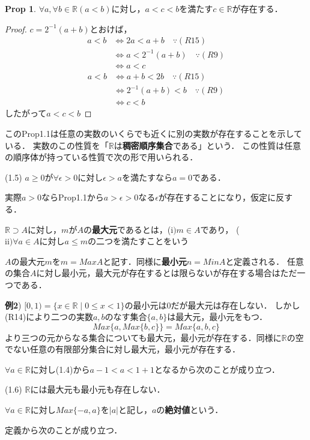 \documentclass{ltjsarticle}
\theoremstyle{definition}
\newtheorem{prop}[thm]{Prop}
\theoremstyle{propcorollarystyle}
\theoremstyle{thmcorollarystyle}
\begin{document}
\begin{prop}
 $\forall a,\forall b \in \mathbb{R}(a<b)$に対し，$a<c<bを満たすc \in \mathbb{R}$が存在する．
\end{prop} 
\begin{proof}
  $c=2^{-1}(a+b)$とおけば，
  \begin{align*}
    a <b 
    &\iff 2a < a+b \quad \because (R15) \\
    &\iff a < 2^{-1}(a+b) \quad \because (R9) \\
    &\iff a < c
  \end{align*}
  \begin{align*}
    a < b 
    &\iff a+b < 2b \quad \because (R15) \\
    &\iff 2^{-1}(a+b) < b \quad \because (R9) \\
    &\iff c < b
  \end{align*}
  したがって$a < c < b$
\end{proof}

このProp1.1は任意の実数のいくらでも近くに別の実数が存在することを示している．
実数のこの性質を「$\mathbb{R}$は\textbf{稠密順序集合}である」という．
この性質は任意の順序体が持っている性質で次の形で用いられる．\par
(1.5) $a \ge 0$が$\forall \epsilon >0$に対し$\epsilon > a$を満たすなら$a = 0$である．\par
実際$a > 0$ならProp1.1から$a>\epsilon >0なる\epsilon$が存在することになり，仮定に反する．

$\mathbb{R} \supset A$に対し，$mがA$の\textbf{最大元}であるとは，($\mathrm{i})m \in A$であり，
($\mathrm{ii})\forall a \in A に対しa \le m$の二つを満たすことをいう\par
$Aの最大元mをm=MaxA$と記す．同様に\textbf{最小元}$n=MinA$と定義される．
任意の集合$A$に対し最小元，最大元が存在するとは限らないが存在する場合はただ一つである．\par
\textbf{例2}) $[0,1)=\{x \in \mathbb{R} \mid 0 \le x <1\}$の最小元は0だが最大元は存在しない．
しかし(R14)により二つの実数$a,bのなす集合\{a,b\}$は最大元，最小元をもつ．
\begin{equation*}
  Max\{a, Max\{b,c\}\}=Max\{a,b,c\}
\end{equation*}
より三つの元からなる集合についても最大元，最小元が存在する．同様に$\mathbb{R}$の空でない任意の有限部分集合に対し最大元，最小元が存在する．\par
 $\forall a \in \mathbb{R}$に対し(1.4)から$a-1<a<1+1$となるから次のことが成り立つ．\par
(1.6) $\mathbb{R}$には最大元も最小元も存在しない．\par
$\forall a \in \mathbb{R}$に対し$Max\{-a,a\}を|a|と記し，a$の\textbf{絶対値}という．\par
定義から次のことが成り立つ．\par
\end{document}
